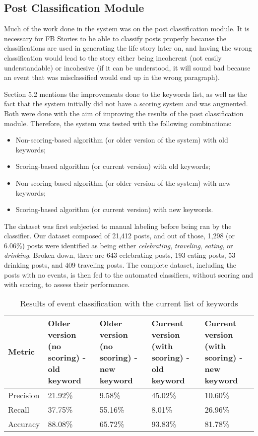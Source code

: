 \subsection{Post Classification Module}
Much of the work done in the system was on the post classification module. It is necessary for FB Stories to be able to classify posts properly because the classifications are used in generating the life story later on, and having the wrong classification would lead to the story either being incoherent (not easily understandable) or incohesive (if it can be understood, it will sound bad because an event that was misclassified would end up in the wrong paragraph).

Section 5.2 mentions the improvements done to the keywords list, as well as the fact that the system initially did not have a scoring system and was augmented. Both were done with the aim of improving the results of the post classification module. Therefore, the system was tested with the following combinations:
\begin{itemize}
	\item Non-scoring-based algorithm (or older version of the system) with old keywords;
	\item Scoring-based algorithm (or current version) with old keywords;
	\item Non-scoring-based algorithm (or older version of the system) with new keywords;
	\item Scoring-based algorithm (or current version) with new keywords.
\end{itemize}

The dataset was first subjected to manual labeling before being ran by the classifier. Our dataset composed of 21,412 posts, and out of those, 1,298 (or 6.06\%) posts were identified as being either \textit{celebrating}, \textit{traveling}, \textit{eating}, or \textit{drinking}. Broken down, there are 643 celebrating posts, 193 eating posts, 53 drinking posts, and 409 traveling posts. The complete dataset, including the posts with no events, is then fed to the automated classifiers, without scoring and with scoring, to assess their performance. 

\begin{table}[ph!]   %
	\centering
	\caption{Results of event classification with the current list of keywords} \vspace{0.25em}
	\begin{tabular}{|p{1in}|p{1in}|p{1in}|p{1in}|p{1in}|} \hline
		\centering Metric & Older version (no scoring) - old keyword & Older version (no scoring) - new keyword & Current version (with scoring) - old keyword & Current version (with scoring) - new keyword \\ \hline
		Precision & 21.92\% & 9.58\% & 45.02\% & 10.60\% \\ \hline
		Recall & 37.75\% & 55.16\% & 8.01\% & 26.96\% \\ \hline
		Accuracy & 88.08\% & 65.72\%  & 93.83\% & 81.78\% \\ \hline
	\end{tabular}
	\label{tab:eventclassification-results}
\end{table}


